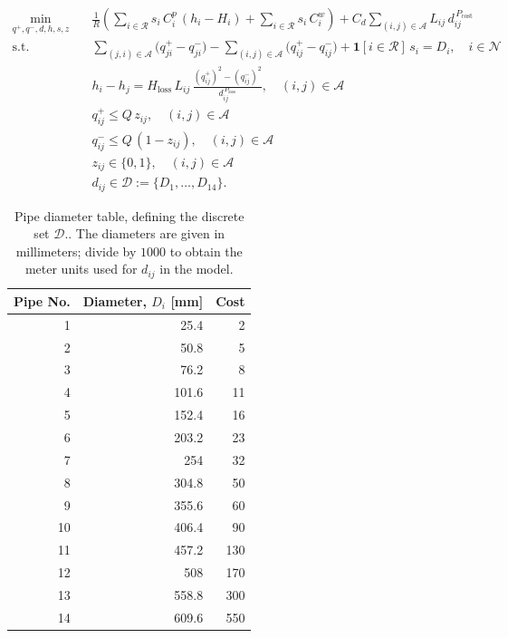 \documentclass[11pt]{article}
\newcommand{\qp}{q^{+}}
\newcommand{\qn}{q^{-}}
\begin{document}
\begin{subequations}
\label{eq:minlp}
\begin{align}
  \min_{\qp,\qn,d,h,s,z}\quad
    & \frac{1}{R}\!\left(\sum_{i\in\mathcal{R}} s_i\,C^{p}_i\,(h_i-H_i)
        + \sum_{i\in\mathcal{R}} s_i\,C^{w}_i\right) 
       + C_d\sum_{(i,j)\in\mathcal{A}} L_{ij}\,d_{ij}^{\,P_{\text{cost}}}
    \label{eq:minlp-cost}\\[4pt]
  \text{s.t.}\quad
    & \sum_{(j,i)\in\mathcal{A}} \bigl(\qp_{ji}-\qn_{ji}\bigr)
      - \sum_{(i,j)\in\mathcal{A}} \bigl(\qp_{ij}-\qn_{ij}\bigr)
      + \mathbf{1}[i\in\mathcal{R}]\,s_i = D_i,
      \quad i\in\mathcal{N}
    \label{eq:minlp-cont}\\[2pt]
    & h_i - h_j = H_{\text{loss}}\,L_{ij}\,\frac{(\qp_{ij})^2-(\qn_{ij})^2}{d_{ij}^{\,P_{\text{loss}}}},
      \quad (i,j)\in\mathcal{A}
    \label{eq:minlp-loss}\\[2pt]
    & \qp_{ij} \le Q\,z_{ij}, \quad (i,j)\in\mathcal{A}
    \label{eq:minlp-qpup}\\[2pt]
    & \qn_{ij} \le Q\,(1-z_{ij}), \quad (i,j)\in\mathcal{A}
    \label{eq:minlp-qnup}\\[2pt]
    & z_{ij}\in\{0,1\}, \quad (i,j)\in\mathcal{A}\\[2pt]
    & d_{ij}\in\mathcal{D} := \{D_1,\ldots,D_{14}\}.
    \label{eq:minlp-bin}
\end{align}
\end{subequations}

\begin{table}[htb]
  \centering
  \caption{Pipe diameter table, defining the discrete set $\mathcal{D}$..  The diameters are given in millimeters; divide by
    $1000$ to obtain the meter units used for $d_{ij}$ in the model.}
  \label{tab:diameters}
  \begin{tabular}{r r r}
    \toprule
    Pipe No. & Diameter, $D_i$ [mm] & Cost \\
    \midrule
    1  & 25.4  &   2 \\
    2  & 50.8  &   5 \\
    3  & 76.2  &   8 \\
    4  & 101.6 &  11 \\
    5  & 152.4 &  16 \\
    6  & 203.2 &  23 \\
    7  & 254   &  32 \\
    8  & 304.8 &  50 \\
    9  & 355.6 &  60 \\
    10 & 406.4 &  90 \\
    11 & 457.2 & 130 \\
    12 & 508   & 170 \\
    13 & 558.8 & 300 \\
    14 & 609.6 & 550 \\
    \bottomrule
  \end{tabular}
\end{table}
\end{document}
